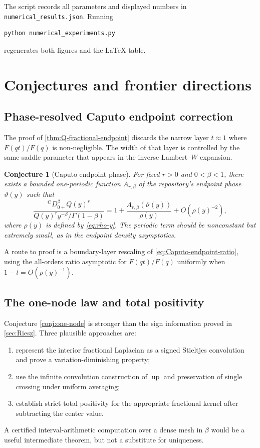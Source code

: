 \documentclass[11pt,oneside]{article}
\numberwithin{equation}{section}
\theoremstyle{plain}
\newtheorem{conjecture}[theorem]{Conjecture}
\theoremstyle{definition}
\theoremstyle{remark}
\newcommand{\Up}{\operatorname{up}}
\newcommand{\Ccap}{\mathrm C}
\begin{document}
The script records all parameters and displayed numbers in
\texttt{numerical\_results.json}.  Running
\begin{lstlisting}[style=code,language=bash]
python numerical_experiments.py
\end{lstlisting}
regenerates both figures and the LaTeX table.

\section{Conjectures and frontier directions}
\label{sec:frontiers}

\subsection{Phase-resolved Caputo endpoint correction}

The proof of \cref{thm:Q-fractional-endpoint} discards the narrow layer
$t\approx1$ where $F(qt)/F(q)$ is non-negligible.  The width of that layer is
controlled by the same saddle parameter that appears in the inverse
Lambert--$W$ expansion.

\begin{conjecture}[Caputo endpoint phase]
\label{conj:Caputo-phase}
For fixed $r>0$ and $0<\beta<1$, there exists a bounded one-periodic function
$A_{r,\beta}$ of the repository's endpoint phase $\vartheta(y)$ such that
\begin{equation}
 \frac{{}^{\Ccap}D_{0+}^\beta Q(y)^r}
 {Q(y)^r y^{-\beta}/\Gamma(1-\beta)}
 =1+\frac{A_{r,\beta}(\vartheta(y))}{\rho(y)}
  +O\!\left(\rho(y)^{-2}\right),
 \label{eq:Caputo-phase-conjecture}
\end{equation}
where $\rho(y)$ is defined by \cref{eq:rho-y}.  The periodic term should be
nonconstant but extremely small, as in the endpoint density asymptotics.
\end{conjecture}

A route to proof is a boundary-layer rescaling of
\cref{eq:Caputo-endpoint-ratio}, using the all-orders ratio asymptotic for
$F(qt)/F(q)$ uniformly when $1-t=O(\rho(y)^{-1})$.

\subsection{The one-node law and total positivity}

Conjecture \ref{conj:one-node} is stronger than the sign information proved in
\cref{sec:Riesz}.  Three plausible approaches are:
\begin{enumerate}
\item represent the interior fractional Laplacian as a signed Stieltjes
      convolution and prove a variation-diminishing property;
\item use the infinite convolution construction of $\Up$ and preservation of
      single crossing under uniform averaging;
\item establish strict total positivity for the appropriate fractional kernel
      after subtracting the center value.
\end{enumerate}
A certified interval-arithmetic computation over a dense mesh in $\beta$ would
be a useful intermediate theorem, but not a substitute for uniqueness.
\end{document}
